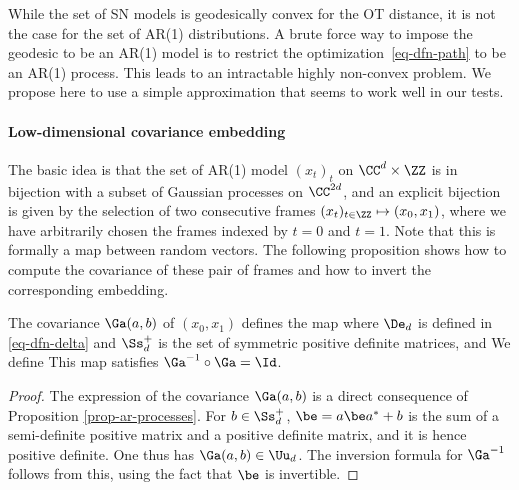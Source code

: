 While the set of SN models is geodesically convex for the OT distance, it is not the case for the set of AR(1) distributions. A brute force way to impose the geodesic to be an AR(1) model is to restrict the optimization~\eqref{eq-dfn-path} to be an AR(1) process. This leads to an intractable highly non-convex problem. We propose here to use a simple approximation that seems to work  well in our tests.

\paragraph{Low-dimensional covariance embedding}

The basic idea is that the set of AR(1) model $(x_t)_t$ on $\CC^d \times \ZZ$ is in bijection with a subset of Gaussian processes on $\CC^{2d}$, and an explicit bijection is given by the selection of two consecutive frames  $(x_t)_{t \in \ZZ} \mapsto (x_0,x_1)$,
where we have arbitrarily chosen the frames indexed by $t=0$ and $t=1$. Note that this is formally a map between random vectors. The following proposition shows how to compute the covariance of these pair of frames and how to invert the corresponding embedding. 

\begin{proposition}
	The covariance $\Ga(a,b)$ of $(x_0,x_1)$ defines the map
	where $\De_d$ is defined in \eqref{eq-dfn-delta} and $\Ss_d^+$ is the set of symmetric 
	positive definite matrices, and 
	We define 
	This map satisfies $\Ga^{-1} \circ \Ga = \Id$.
\end{proposition}
\begin{proof}
	The expression of the covariance $\Ga(a,b)$ is a direct consequence of Proposition \ref{prop-ar-processes}. For $b \in \Ss_d^+$, $\be = a \be a^* + b$ is the sum of a  semi-definite positive matrix and a positive definite matrix, and it is hence positive definite. One thus has $\Ga(a,b) \in \Uu_d$.
	The inversion formula for $\Ga^{-1}$ follows from this, using the fact that $\be$ is invertible. 
\end{proof}

